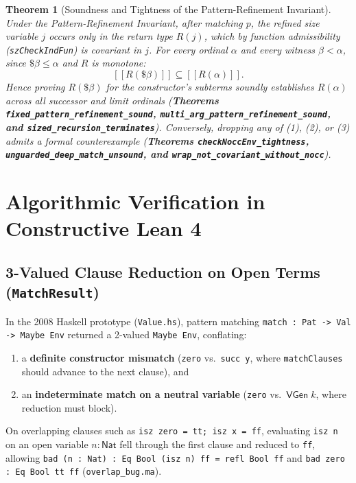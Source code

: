 \documentclass[11pt,a4paper]{article}
\newcommand{\llbracket}{[\![}
\newcommand{\rrbracket}{]\!]}
\newtheorem{theorem}{Theorem}[section]
\begin{document}
\begin{theorem}[Soundness and Tightness of the Pattern-Refinement Invariant]
Under the Pattern-Refinement Invariant, after matching $p$, the refined size variable $j$ occurs only in the return type $R(j)$, which by function admissibility (\texttt{szCheckIndFun}) is covariant in $j$.
For every ordinal $\alpha$ and every witness $\beta < \alpha$, since $\$ \beta \le \alpha$ and $R$ is monotone:
\[
  \llbracket R(\$ \beta) \rrbracket \subseteq \llbracket R(\alpha) \rrbracket.
\]
Hence proving $R(\$ \beta)$ for the constructor's subterms soundly establishes $R(\alpha)$ across all successor and limit ordinals (\textbf{Theorems \texttt{fixed\_pattern\_refinement\_sound}, \texttt{multi\_arg\_pattern\_refinement\_sound}, and \texttt{sized\_recursion\_terminates}}).
Conversely, dropping any of (1), (2), or (3) admits a formal counterexample (\textbf{Theorems \texttt{checkNoccEnv\_tightness}, \texttt{unguarded\_deep\_match\_unsound}, and \texttt{wrap\_not\_covariant\_without\_nocc}}).
\end{theorem}

\section{Algorithmic Verification in Constructive Lean 4}

\subsection{3-Valued Clause Reduction on Open Terms (\texttt{MatchResult})}

In the 2008 Haskell prototype (\texttt{Value.hs}), pattern matching \texttt{match : Pat -> Val -> Maybe Env} returned a 2-valued \texttt{Maybe Env}, conflating:
\begin{enumerate}
  \item a \textbf{definite constructor mismatch} (\texttt{zero} vs.\ \texttt{succ y}, where \texttt{matchClauses} should advance to the next clause), and
  \item an \textbf{indeterminate match on a neutral variable} (\texttt{zero} vs.\ $\mathsf{VGen}\;k$, where reduction must block).
\end{enumerate}
On overlapping clauses such as \texttt{isz zero = tt; isz x = ff}, evaluating \texttt{isz n} on an open variable $n : \mathsf{Nat}$ fell through the first clause and reduced to \texttt{ff}, allowing \texttt{bad (n : Nat) : Eq Bool (isz n) ff = refl Bool ff} and \texttt{bad zero : Eq Bool tt ff} (\texttt{overlap\_bug.ma}).
\end{document}
